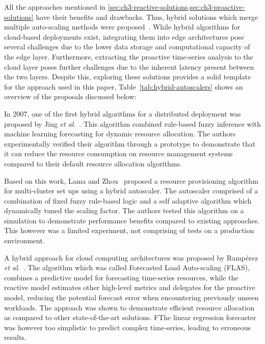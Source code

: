 All the approaches mentioned in \cref{sec:ch3-reactive-solutions,sec:ch3-proactive-solutions} have their benefits and drawbacks. Thus, hybrid solutions which merge multiple auto-scaling methods were proposed~\cite{qu2018auto}. While hybrid algorithms for cloud-based deployments exist, integrating them into edge architectures pose several challenges due to the lower data storage and computational capacity of the edge layer. Furthermore, extracting the proactive time-series analysis to the cloud layer poses further challenges due to the inherent latency present between the two layers. Despite this, exploring these solutions provides a solid template for the approach used in this paper, Table~\ref{tab:hybrid-autoscalers} shows an overview of the proposals discussed below:\par

In 2007, one of the first hybrid algorithms for a distributed deployment was proposed by Jing \textit{et al}.~\cite{xu2007use}. This algorithm combined rule-based fuzzy inference with machine learning forecasting for dynamic resource allocation. The authors experimentally verified their algorithm through a prototype to demonstrate that it can reduce the resource consumption on resource management systems compared to their default resource allocation algorithms.\par

Based on this work, Lama and Zhou~\cite{lama2009efficient} proposed a resource provisioning algorithm for multi-cluster set ups using a hybrid autoscaler. The autoscaler comprised of a combination of fixed fuzzy rule-based logic and a self adaptive algorithm which dynamically tuned the scaling factor. The authors tested this algorithm on a simulation to demonstrate performance benefits compared to existing approaches. This however was a limited experiment, not comprising of tests on a production environment.\par

A hybrid approach for cloud computing architectures was proposed by Ramp{\'e}rez \textit{et al}.~\cite{ramperez2021flas}. The algorithm which was called Forecasted Load Auto-scaling (FLAS), combines a predictive model for forecasting time-series resources, while the reactive model estimates other high-level metrics and delegates for the proactive model, reducing the potential forecast error when encountering previously unseen workloads. The approach was shown to demonstrate efficient resource allocation as compared to other state-of-the-art solutions. FThe linear regression forecaster was however too simplistic to predict complex time-series, leading to erroneous results.\par

